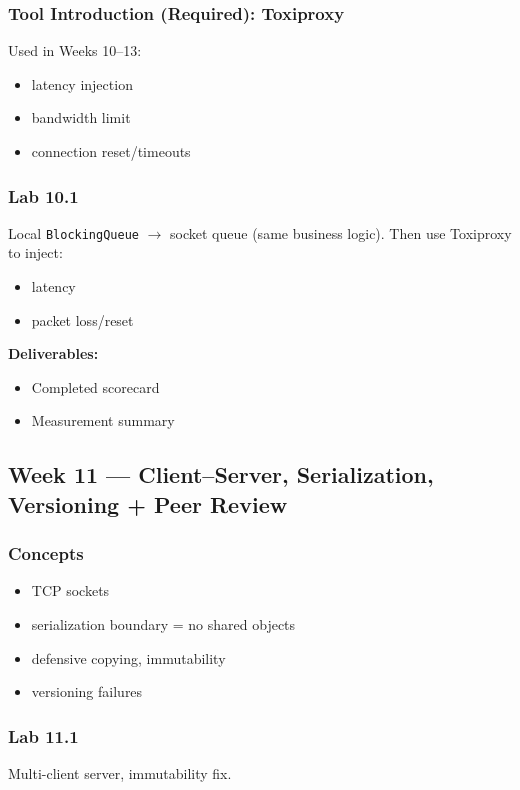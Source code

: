 \documentclass[11pt,a4paper]{article}
\begin{document}
	\subsubsection*{Tool Introduction (Required): Toxiproxy}
	Used in Weeks 10--13:
	\begin{itemize}[leftmargin=*]
		\item latency injection
		\item bandwidth limit
		\item connection reset/timeouts
	\end{itemize}
	
	\subsubsection*{Lab 10.1}
	Local \texttt{BlockingQueue} $\rightarrow$ socket queue (same business logic).  
	Then use Toxiproxy to inject:
	\begin{itemize}[leftmargin=*]
		\item latency
		\item packet loss/reset
	\end{itemize}
	
	\textbf{Deliverables:}
	\begin{itemize}[leftmargin=*]
		\item Completed scorecard
		\item Measurement summary
	\end{itemize}
	
	\subsection*{Week 11 --- Client--Server, Serialization, Versioning + Peer Review}
	
	\subsubsection*{Concepts}
	\begin{itemize}[leftmargin=*]
		\item TCP sockets
		\item serialization boundary = no shared objects
		\item defensive copying, immutability
		\item versioning failures
	\end{itemize}
	
	\subsubsection*{Lab 11.1}
	Multi-client server, immutability fix.
	
\end{document}
